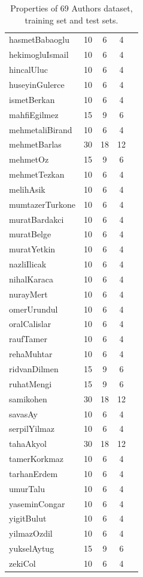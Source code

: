 \documentclass[twocolumn,preprintnumbers,amsmath,amssymb,superscriptaddress,pre]{revtex4}
\theoremstyle{plain}%
\theoremstyle{definition}
\theoremstyle{remark}
\begin{document}
\begin{table}
\begin{adjustbox}{totalheight=\baselineskip}
\begin{tabular}{ |l|c|c|c|c }
hasmetBabaoglu & 10 & 6 & 4 \\
hekimogluIsmail & 10 & 6 & 4 \\
hincalUluc & 10 & 6 & 4 \\
huseyinGulerce & 10 & 6 & 4 \\
ismetBerkan & 10 & 6 & 4 \\
mahfiEgilmez & 15 & 9 & 6 \\
mehmetaliBirand & 10 & 6 & 4 \\
mehmetBarlas & 30 & 18 & 12 \\
mehmetOz & 15 & 9 & 6 \\
mehmetTezkan & 10 & 6 & 4 \\
melihAsik & 10 & 6 & 4 \\
mumtazerTurkone & 10 & 6 & 4 \\
muratBardakci & 10 & 6 & 4 \\
muratBelge & 10 & 6 & 4 \\
muratYetkin & 10 & 6 & 4 \\
nazliIlicak & 10 & 6 & 4 \\
nihalKaraca & 10 & 6 & 4 \\
nurayMert & 10 & 6 & 4 \\
omerUrundul & 10 & 6 & 4 \\
oralCalislar & 10 & 6 & 4 \\
raufTamer & 10 & 6 & 4 \\
rehaMuhtar & 10 & 6 & 4 \\
ridvanDilmen & 15 & 9 & 6 \\
ruhatMengi & 15 & 9 & 6 \\
samikohen & 30 & 18 & 12 \\
savasAy & 10 & 6 & 4 \\
serpilYilmaz & 10 & 6 & 4 \\
tahaAkyol & 30 & 18 & 12 \\
tamerKorkmaz & 10 & 6 & 4 \\
tarhanErdem & 10 & 6 & 4 \\
umurTalu & 10 & 6 & 4 \\
yaseminCongar & 10 & 6 & 4 \\
yigitBulut & 10 & 6 & 4 \\
yilmazOzdil & 10 & 6 & 4 \\
yukselAytug & 15 & 9 & 6 \\
zekiCol & 10 & 6 & 4 \\
 \hline
\end{tabular}
\end{adjustbox}
\caption{Properties of 69 Authors dataset, training set and test sets.}
\label{table:1}
\end{table}
\fi
\end{document}

